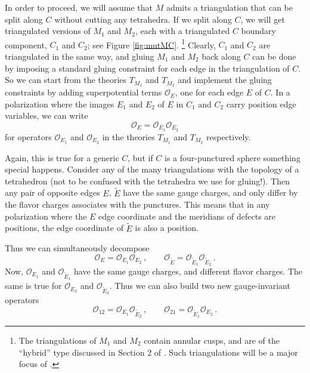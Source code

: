 \documentclass[11pt,letterpaper]{article}
\numberwithin{equation}{section}
\newcommand{\CO}{\mathcal{O}}
\begin{document}
In order to proceed, we will assume that $M$ admits a triangulation that can be split along $C$ without cutting any tetrahedra.
If we split along $C$,  we will get triangulated versions of $M_1$ and $M_2$, each with a triangulated $C$ boundary component, $C_1$ and $C_2$; see Figure \ref{fig:mutMC}.%
%
\footnote{The triangulations of $M_1$ and $M_2$ contain annular cusps, and are of the ``hybrid'' type discussed in Section 2 of \cite{DGG}. Such triangulations will be a major focus of \cite{DGGV-hybrid}.} %
%
Clearly, $C_1$ and $C_2$ are triangulated in the same way, and gluing $M_1$ and $M_2$ back along $C$ can be done by imposing a
standard gluing constraint for each edge in the triangulation of $C$.
So we can start from the  theories $T_{M_1}$ and $T_{M_2}$ and implement the gluing constraints by adding superpotential terms $\CO_E$, one for each edge $E$ of $C$.
In a polarization where the images $E_1$ and $E_2$ of $E$ in $C_1$ and $C_2$ carry position edge variables,
we can write
\begin{equation}
\CO_E =  \CO_{E_1} \CO_{E_2}
\end{equation}
for operators $ \CO_{E_1}$ and $ \CO_{E_2}$ in the theories $T_{M_1}$ and $T_{M_2}$ respectively.

Again, this is true for a generic $C$, but if $C$ is a four-punctured sphere something special happens.
Consider any of the many triangulations with the topology of a tetrahedron (not to be confused with the tetrahedra we use for gluing!).
Then any pair of opposite edges $E$, $\tilde E$ have the same gauge charges, and only differ by the flavor charges associates with the punctures. This means that in any polarization where the $E$ edge coordinate and the meridians of defects are positions, the edge coordinate of $\tilde E$ is also a position.

Thus we can simultaneously decompose
%
\begin{equation} \label{mutO}
\CO_E =  \CO_{E_1} \CO_{E_2}\,,  \qquad   \CO_{\tilde E} =  \CO_{\tilde E_1} \CO_{\tilde E_2}\,.
\end{equation}
%
Now, $\CO_{E_1}$ and $\CO_{\tilde E_1}$ have the same gauge charges, and different flavor charges.
The same is true for $\CO_{E_2}$ and $\CO_{\tilde E_2}$. Thus we can also build two new gauge-invariant operators
%
\begin{equation} \label{mutOmixed}
\CO_{12} =  \CO_{E_1} \CO_{\tilde E_2}\,,  \qquad   \CO_{21} =  \CO_{\tilde E_1} \CO_{E_2}\,.
\end{equation}
\end{document}
